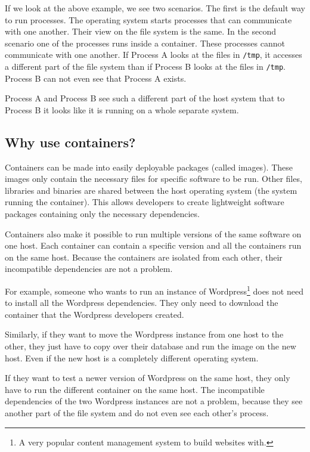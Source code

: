 If we look at the above example, we see two scenarios. The first is the default way to run processes. The operating system starts processes that can communicate with one another. Their view on the file system is the same.
In the second scenario one of the processes runs inside a container. These processes cannot communicate with one another. If Process A looks at the files in \lstinline{/tmp}, it accesses a different part of the file system than if Process B looks at the files in \lstinline{/tmp}. Process B can not even see that Process A exists.

\hfill

Process A and Process B see such a different part of the host system that to Process B it looks like it is running on a whole separate system.

\subsection{Why use containers?}

Containers can be made into easily deployable packages (called images). These images only contain the necessary files for specific software to be run. Other files, libraries and binaries are shared between the host operating system (the system running the container). This allows developers to create lightweight software packages containing only the necessary dependencies.

\hfill

Containers also make it possible to run multiple versions of the same software on one host. Each container can contain a specific version and all the containers run on the same host. Because the containers are isolated from each other, their incompatible dependencies are not a problem.

\hfill

For example, someone who wants to run an instance of Wordpress\footnote{A very popular content management system to build websites with.} does not need to install all the Wordpress dependencies. They only need to download the container that the Wordpress developers created.

Similarly, if they want to move the Wordpress instance from one host to the other, they just have to copy over their database and run the image on the new host. Even if the new host is a completely different operating system.

If they want to test a newer version of Wordpress on the same host, they only have to run the different container on the same host. The incompatible dependencies of the two Wordpress instances are not a problem, because they see another part of the file system and do not even see each other's process.

